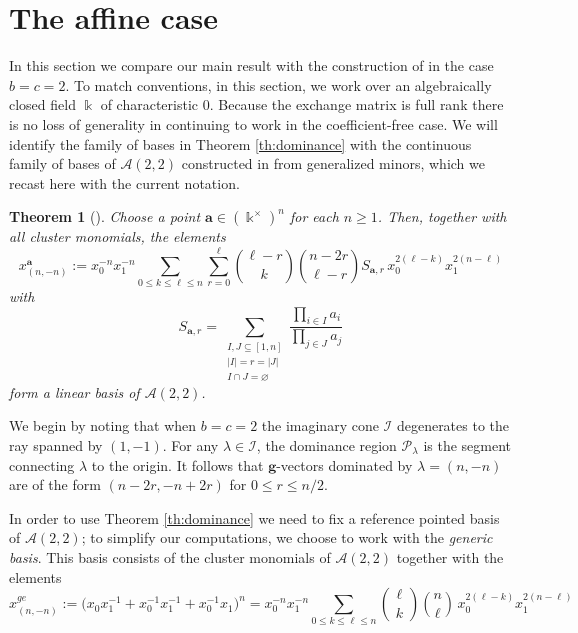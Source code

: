 \documentclass{amsart}
\newtheorem{theorem}{Theorem}
\numberwithin{theorem}{section}
\newcommand{\bfa}{\boldsymbol{a}}
\newcommand{\bfg}{\boldsymbol{g}}
\newcommand{\cA}{\mathcal{A}}
\newcommand{\cI}{\mathcal{I}}
\newcommand{\cP}{\mathcal{P}}
\newcommand{\kk}{\Bbbk}
\begin{document}
\section{The affine case}
\label{sec:affine}

  In this section we compare our main result with the construction of \cite{RSW19} in the case $b=c=2$.
  To match conventions, in this section, we work over an algebraically closed field $\kk$ of characteristic 0.
  Because the exchange matrix is full rank there is no loss of generality in continuing to work in the coefficient-free case.
  We will identify the family of bases in Theorem \ref{th:dominance} with the continuous family of bases of $\cA(2,2)$ constructed in \cite{RSW19} from generalized minors, which we recast here with the current notation. 

  \begin{theorem}[{\cite[Theorem 4.6]{RSW19}}]
    Choose a point $\bfa\in(\kk^\times)^n$ for each $n\geq1$.
    Then, together with all cluster monomials, the elements 
    \begin{equation}
      \label{eq:generalized minor}
      x_{(n,-n)}^{\bfa}:= x_0^{-n} x_1^{-n} \sum_{0 \leq k \leq \ell \leq n} \sum\limits_{r=0}^\ell {\ell-r\choose k} {n-2r\choose \ell-r} S_{\bfa,r}  \, x_0^{2(\ell-k)} x_1^{2(n-\ell)}
    \end{equation}
    with
    \[
      S_{\bfa,r}=\sum\limits_{\substack{I,J\subseteq[1,n]\\|I|=r=|J|\\ I\cap J=\varnothing}}\frac{\prod_{i\in I} a_i}{\prod_{j\in J} a_j}
    \]
    form a linear basis of $\cA(2,2)$.
  \end{theorem}

  We begin by noting that when $b=c=2$ the imaginary cone $\cI$ degenerates to the ray spanned by $(1,-1)$.
  For any $\lambda\in\cI$, the dominance region $\cP_\lambda$ is the segment connecting $\lambda$ to the origin.
  It follows that $\bfg$-vectors dominated by $\lambda=(n,-n)$ are of the form $(n-2r,-n+2r)$ for $0\leq r \leq n/2$.

  In order to use Theorem \ref{th:dominance} we need to fix a reference pointed basis of $\cA(2,2)$; to simplify our computations, we choose to work with the \emph{generic basis}.
  This basis consists of the cluster monomials of $\cA(2,2)$ together with the elements
  \[
    x_{(n,-n)}^{ge}
    :=
		\Big(x_0 x_1^{-1} + x_0^{-1}x_1^{-1} + x_0^{-1}x_1\Big)^n
		=
    x_0^{-n} x_1^{-n}
    \sum_{0 \leq k \leq \ell \leq n}
    {\ell\choose k} {n\choose \ell}
    \, x_0^{2(\ell-k)} x_1^{2(n-\ell)}
  \]
\end{document}
